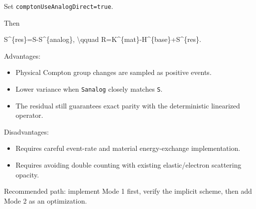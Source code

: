 \documentclass[
]{article}
\newenvironment{Shaded}{}{}
\newcommand{\NormalTok}[1]{#1}
\providecommand{\tightlist}{%
  \setlength{\itemsep}{0pt}\setlength{\parskip}{0pt}}
\begin{document}
Set \texttt{comptonUseAnalogDirect=true}.

Then

\begin{Shaded}
\begin{Highlighting}[]
\NormalTok{S\^{}\{res\}=S{-}S\^{}\{analog\},}
\NormalTok{\textbackslash{}qquad}
\NormalTok{R=K\^{}\{mat\}{-}H\^{}\{base\}+S\^{}\{res\}.}
\end{Highlighting}
\end{Shaded}

Advantages:

\begin{itemize}
\tightlist
\item
  Physical Compton group changes are sampled as positive events.
\item
  Lower variance when \texttt{Sanalog} closely matches \texttt{S}.
\item
  The residual still guarantees exact parity with the deterministic
  linearized operator.
\end{itemize}

Disadvantages:

\begin{itemize}
\tightlist
\item
  Requires careful event-rate and material energy-exchange
  implementation.
\item
  Requires avoiding double counting with existing elastic/electron
  scattering opacity.
\end{itemize}

Recommended path: implement Mode 1 first, verify the implicit scheme,
then add Mode 2 as an optimization.
\end{document}
